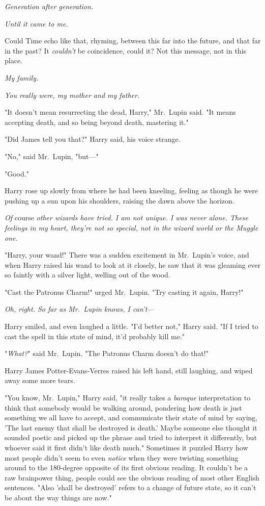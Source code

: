 \emph{Generation after generation.}

\emph{Until it came to me.}

Could Time echo like that, rhyming, between this far into the future, and that 
far in the past? It \emph{couldn't} be coincidence, could it? Not this message, 
not in this place.

\emph{My family.}

\emph{You really were, my mother and my father.}

"It doesn't mean resurrecting the dead, Harry," Mr.~Lupin said. "It means 
accepting death, and so being beyond death, mastering it."

"Did James tell you that?" Harry said, his voice strange.

"No," said Mr.~Lupin, "but---"

"Good."

Harry rose up slowly from where he had been kneeling, feeling as though he were 
pushing up a sun upon his shoulders, raising the dawn above the horizon.

\emph{Of} course\emph{ other wizards have tried. I am not unique. I was never 
alone. These feelings in my heart, they're not so special, not in the wizard 
world or the Muggle one.}

"Harry, your wand!" There was a sudden excitement in Mr.~Lupin's voice, and 
when Harry raised his wand to look at it closely, he saw that it was gleaming 
ever so faintly with a silver light, welling out of the wood.

"Cast the Patronus Charm!" urged Mr.~Lupin. "Try casting it again, Harry!"

\emph{Oh, right. So far as Mr.~Lupin knows, I can't---}

Harry smiled, and even laughed a little. "I'd better not," Harry said. "If I 
tried to cast the spell in this state of mind, it'd probably kill me."

"\emph{What?}" said Mr.~Lupin. "The Patronus Charm doesn't do that!"

Harry James Potter-Evans-Verres raised his left hand, still laughing, and wiped 
away some more tears.

"You know, Mr.~Lupin," Harry said, "it really takes a \emph{baroque} 
interpretation to think that somebody would be walking around, pondering how 
death is just something we all have to accept, and communicate their state of 
mind by saying, 'The last enemy that shall be destroyed is death.' Maybe 
someone else thought it sounded poetic and picked up the phrase and tried to 
interpret it differently, but whoever said it first didn't like death much." 
Sometimes it puzzled Harry how most people didn't seem to even \emph{notice} 
when they were twisting something around to the 180-degree opposite of its 
first obvious reading. It couldn't be a raw brainpower thing, people could see 
the obvious reading of most other English sentences. "Also 'shall be destroyed' 
refers to a change of future state, so it can't be about the way things are 
now."

